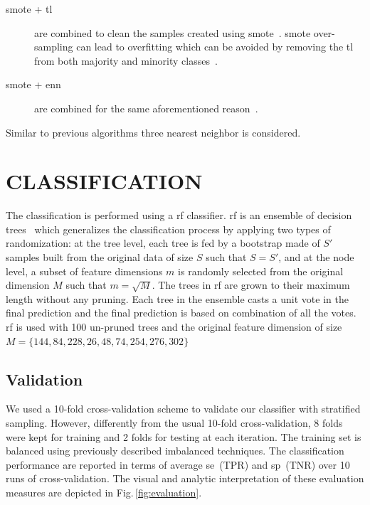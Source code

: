 \begin{description}
  \item[\ac{smote} + \ac{tl}] are combined to clean the samples created using \ac{smote}~\cite{batista2003balancing}.
\ac{smote} over-sampling can lead to overfitting which can be avoided by removing the \ac{tl} from both majority and minority classes~\cite{prati2009data}.
  \item[\ac{smote} + \ac{enn}] are combined for the same aforementioned reason~\cite{batista2004study}.
\end{description}
Similar to previous algorithms three nearest neighbor is considered.

\section{\uppercase{Classification}}
\label{sec:clas-val}

\noindent The classification is performed using a \ac{rf} classifier.
\Ac{rf} is an ensemble of decision trees~\cite{breiman2001random} which generalizes the classification process by applying two types of randomization: at the tree level, each tree is fed by a bootstrap made of $S'$ samples built from the original data of size $S$ such that  $S=S'$, and at the node level, a subset of feature dimensions $m$ is randomly selected from the original dimension $M$ such that $m=\sqrt{M}$. 
The trees in \ac{rf} are grown to their maximum length without any pruning.
Each tree in the ensemble casts a unit vote in the final prediction and the final prediction is based on combination of all the votes. 
\Ac{rf} is used with 100 un-pruned trees and the original feature dimension of size $M=\{144,84,228,26,48,74,254,276,302\}$

\subsection{Validation}
We used a 10-fold cross-validation scheme to validate our classifier with stratified sampling.
However, differently from the usual 10-fold cross-validation, 8 folds were kept for training and 2 folds for testing at each iteration. 
The training set is balanced using previously described imbalanced techniques. 
The classification performance are reported in terms of average \ac{se}~(TPR) and \ac{sp}~(TNR) over 10 runs of cross-validation. 
The visual and analytic interpretation of these evaluation measures are depicted in Fig.\,\ref{fig:evaluation}.

